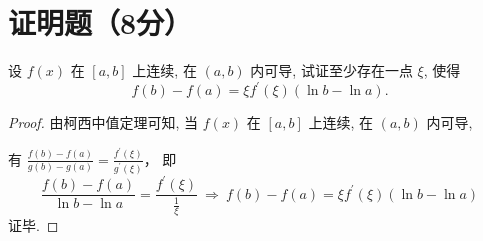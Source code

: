 \documentclass{USTBExam}
\begin{document}
\section{证明题（8分）}

\begin{problem}
  设 $f(x)$ 在 $[a, b]$ 上连续, 在 $(a, b)$ 内可导, 试证至少存在一点 $\xi$, 使得
  $$f(b)-f(a)=\xi f^{\prime}(\xi)(\ln b-\ln a).$$
\end{problem}

\begin{proof}
  由柯西中值定理可知, 当 $f(x)$ 在 $[a, b]$ 上连续, 在 $(a, b)$ 内可导,

  有
  $\frac{f(b)-f(a)}{g(b)-g(a)}=\frac{f^{\prime}(\xi)}{g^{\prime}(\xi)}$，
  即
  $$\frac{f(b)-f(a)}{\ln b-\ln a}=\frac{f^{\prime}(\xi)}{\frac{1}{\xi}}
    ~\Rightarrow~
    f(b)-f(a)=\xi f^{\prime}(\xi)(\ln b-\ln a) $$
  证毕.
\end{proof}
\end{document}
